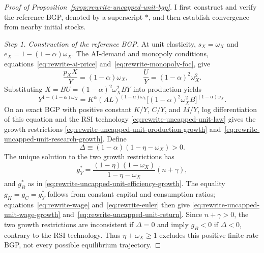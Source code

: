 \begin{proof}[Proof of Proposition~\ref{prop:rewrite-uncapped-unit-bgp}]
\label{proof:rewrite-uncapped-unit-bgp}
I first construct and verify the reference BGP, denoted by a superscript
$*$, and then establish convergence from nearby initial stocks.

\textit{Step 1. Construction of the reference BGP.}
At unit elasticity, $s_X=\omega_X$ and $e_X=1-(1-\alpha)\omega_X$.
The AI-demand and monopoly conditions,
equations~\eqref{eq:rewrite-ai-price} and~\eqref{eq:rewrite-monopoly-foc}, give
\begin{equation}
 \frac{p_XX}{Y}=(1-\alpha)\omega_X,\qquad
 \frac UY=(1-\alpha)^2\omega_X^2.
 \label{eq:rewrite-uncapped-unit-static-shares}
\end{equation}
Substituting $X=BU=(1-\alpha)^2\omega_X^2BY$ into production yields
\begin{equation}
 Y^{1-(1-\alpha)\omega_X}
 =K^\alpha(AL)^{(1-\alpha)\omega_L}
 \bigl[(1-\alpha)^2\omega_X^2B\bigr]^{(1-\alpha)\omega_X}.
 \label{eq:rewrite-uncapped-unit-production}
\end{equation}
On an exact BGP with positive constant $K/Y$, $C/Y$, and $M/Y$,
log differentiation of this equation and the RSI technology
\eqref{eq:rewrite-uncapped-unit-law} gives the growth restrictions
\eqref{eq:rewrite-uncapped-unit-production-growth}
and~\eqref{eq:rewrite-uncapped-unit-research-growth}.
Define
\[
 \Delta\equiv(1-\alpha)(1-\eta-\omega_X)>0.
\]
The unique solution to the two growth restrictions has
\begin{equation}
 g_Y^*=\frac{(1-\eta)(1-\omega_X)}{1-\eta-\omega_X}(n+\gamma),
 \label{eq:rewrite-uncapped-unit-output-growth}
\end{equation}
and $g_B^*$ as in \eqref{eq:rewrite-uncapped-unit-efficiency-growth}.
The equality $g_K=g_C=g_Y^*$ follows from constant capital and consumption ratios;
equations~\eqref{eq:rewrite-wage} and~\eqref{eq:rewrite-euler} then give
\eqref{eq:rewrite-uncapped-unit-wage-growth}
and~\eqref{eq:rewrite-uncapped-unit-return}.
Since $n+\gamma>0$, the two growth restrictions are inconsistent if
$\Delta=0$ and imply $g_B<0$ if $\Delta<0$, contrary to the RSI technology.
Thus $\eta+\omega_X\geq1$ excludes this positive finite-rate BGP,
not every possible equilibrium trajectory.


\end{proof}
